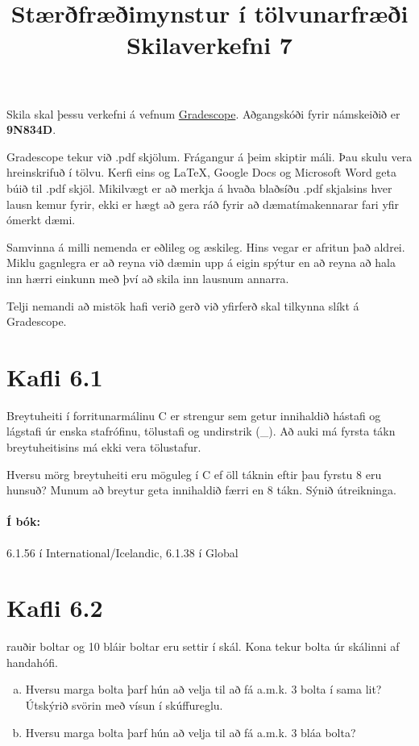 \documentclass{article}
\title{Stærðfræðimynstur í tölvunarfræði \\ Skilaverkefni 7}
\author{}
\begin{document}
\maketitle

Skila skal þessu verkefni á vefnum \href{https://gradescope.com/courses/9487}{Gradescope}. Aðgangskóði fyrir námskeiðið er \textbf{9N834D}. 

Gradescope tekur við .pdf skjölum. Frágangur á þeim skiptir máli. Þau skulu vera hreinskrifuð í tölvu. Kerfi eins og \LaTeX, Google Docs og Microsoft Word geta búið til .pdf skjöl. Mikilvægt er að merkja á hvaða blaðsíðu .pdf skjalsins hver lausn kemur fyrir, ekki er hægt að gera ráð fyrir að dæmatímakennarar fari yfir ómerkt dæmi.

Samvinna á milli nemenda er eðlileg og æskileg. Hins vegar er afritun það aldrei. Miklu gagnlegra er að reyna við dæmin upp á eigin spýtur en að reyna að hala inn hærri einkunn með því að skila inn lausnum annarra.

Telji nemandi að mistök hafi verið gerð við yfirferð skal tilkynna slíkt á Gradescope.

\section{Kafli 6.1}

\question Breytuheiti í forritunarmálinu C er strengur sem getur innihaldið hástafi og lágstafi úr enska stafrófinu, tölustafi og undirstrik (\_). Að auki má fyrsta tákn breytuheitisins má ekki vera tölustafur.

Hversu mörg breytuheiti eru möguleg í C ef öll táknin eftir þau fyrstu 8 eru hunsuð? Munum að breytur geta innihaldið færri en 8 tákn. Sýnið útreikninga.

\paragraph{Í bók:} 6.1.56 í International/Icelandic, 6.1.38 í Global

\section{Kafli 6.2}

 rauðir boltar og 10 bláir boltar eru settir í skál. Kona tekur bolta úr skálinni af handahófi.

\begin{enumerate}[a)]
    \item Hversu marga bolta þarf hún að velja til að fá a.m.k. 3 bolta í sama lit? Útskýrið svörin með vísun í skúffureglu.
    \item Hversu marga bolta þarf hún að velja til að fá a.m.k. 3 bláa bolta?
\end{enumerate}
\end{document}
